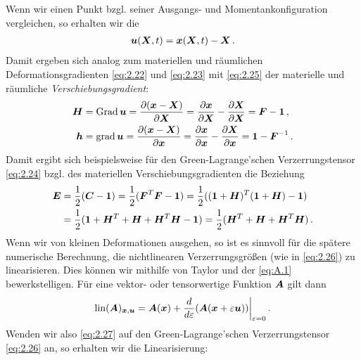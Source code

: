 Wenn wir einen Punkt bzgl. seiner Ausgangs- und Momentankonfiguration vergleichen, so erhalten wir die \textit{}
\begin{align}\label{eq:2.25}
	\boldsymbol u (\boldsymbol X,t) = \boldsymbol x(\boldsymbol X,t)-\boldsymbol X \, .
\end{align}
Damit ergeben sich analog zum materiellen und räumlichen Deformationsgradienten \eqref{eq:2.22} und \eqref{eq:2.23} mit \eqref{eq:2.25} der materielle und räumliche \textit{Verschiebungsgradient}:
\begin{align*}
	\boldsymbol H& = \operatorname{Grad} \boldsymbol u = \frac{\partial(\boldsymbol x - \boldsymbol X)}{\partial \boldsymbol X} = \frac{\partial\boldsymbol x}{\partial \boldsymbol X} - \frac{\partial \boldsymbol X}{\partial \boldsymbol X} = \boldsymbol F - \boldsymbol 1 \, ,  \\
	\boldsymbol h& = \operatorname{grad} \boldsymbol u = \frac{\partial(\boldsymbol x - \boldsymbol X)}{\partial \boldsymbol x} = \frac{\partial\boldsymbol x}{\partial \boldsymbol x} - \frac{\partial \boldsymbol X}{\partial \boldsymbol x} = \boldsymbol 1 - \boldsymbol F^{-1} \, .
\end{align*}
Damit ergibt sich beispielsweise für den Green-Lagrange'schen Verzerrungstensor  \eqref{eq:2.24} bzgl. des materiellen Verschiebungsgradienten die Beziehung
\begin{align}\label{eq:2.26}
\begin{aligned}
	\boldsymbol E& = \frac 12 (\boldsymbol C - \boldsymbol 1) = \frac 1 2 (\boldsymbol F^T\boldsymbol F - \boldsymbol 1) = \frac 12((\boldsymbol 1+\boldsymbol H)^T(\boldsymbol 1+\boldsymbol H)-\boldsymbol 1) \\
	& = \frac 12 (\boldsymbol 1 + \boldsymbol H^T + \boldsymbol H +\boldsymbol H^T \boldsymbol H - \boldsymbol 1) = \frac 12(\boldsymbol H^T+\boldsymbol H+\boldsymbol H^T\boldsymbol H) \, .
\end{aligned}
\end{align}
Wenn wir von kleinen Deformationen ausgehen, so ist es sinnvoll für die spätere numerische Berechnung, die nichtlinearen Verzerrungsgrößen (wie in \eqref{eq:2.26})  zu linearisieren. Dies können wir mithilfe von Taylor und der  \eqref{eq:A.1} bewerkstelligen. Für eine vektor- oder tensorwertige Funktion $\boldsymbol A$ gilt dann
\begin{align}\label{eq:2.27}
	\operatorname{lin}(\boldsymbol A)_{\boldsymbol x,\boldsymbol u} = \boldsymbol A(\boldsymbol x) + \frac d{ d\varepsilon} (\boldsymbol A(\boldsymbol x + \varepsilon \boldsymbol u))\bigg|_{\varepsilon = 0} \, .
\end{align}
Wenden wir also \eqref{eq:2.27} auf den Green-Lagrange'schen Verzerrungstensor \eqref{eq:2.26} an, so erhalten wir die Linearisierung:
